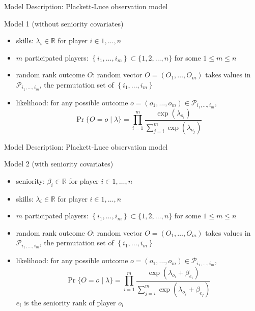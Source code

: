 \begin{frame}{Model Description: Plackett-Luce observation model}

Model 1 (without seniority covariates)
    \begin{itemize}
        \item skills: $\lambda_i\in\mathbb{R}$ for player $i\in 1, \dots, n$
        \item $m$ participated players: $\left\{i_{1}, \ldots, i_{m}\right\} \subset \{1,2, \ldots, n\}$ for some $1\le m\le n$
        \item random rank outcome $O$: random vector $O = (O_1, \dots, O_m)$ takes values in $\mathcal{P}_{i_{1}, \ldots, i_{m}}$, the permutation set of $\left\{i_{1}, \ldots, i_{m}\right\}$
        \item likelihood: for any possible outcome $o = (o_1, \dots, o_m)\in \mathcal{P}_{i_{1}, \ldots, i_{m}}$,
        \begin{equation*}
        \operatorname{Pr}\{O=o \mid \lambda\}=\prod_{i=1}^{m} \frac{\exp \left(\lambda_{o_{i}}\right)}{\sum_{j=i}^{m} \exp \left(\lambda_{o_{j}}\right)}
        \end{equation*}
    \end{itemize}
\end{frame}

\begin{frame}{Model Description: Plackett-Luce observation model}

Model 2 (with seniority covariates)
    \begin{itemize}
        \item seniority: $\beta_i \in\mathbb{R}$ for player $i\in 1, \dots, n$
        \item skills: $\lambda_i\in\mathbb{R}$ for player $i\in 1, \dots, n$
        \item $m$ participated players: $\left\{i_{1}, \ldots, i_{m}\right\} \subset \{1,2, \ldots, n\}$ for some $1\le m\le n$
        \item random rank outcome $O$: random vector $O = (O_1, \dots, O_m)$ takes values in $\mathcal{P}_{i_{1}, \ldots, i_{m}}$, the permutation set of $\left\{i_{1}, \ldots, i_{m}\right\}$
        \item likelihood: for any possible outcome $o = (o_1, \dots, o_m)\in \mathcal{P}_{i_{1}, \ldots, i_{m}}$,
        \begin{equation*}
        \operatorname{Pr}\{O=o \mid \lambda\}=\prod_{i=1}^{m} \frac{\exp \left(\lambda_{o_{i}} + \beta_{e_i}\right)}{\sum_{j=i}^{m} \exp \left(\lambda_{o_{j}} + \beta_{e_j}\right)}
        \end{equation*}
        $e_i$ is the seniority rank of player $o_i$
    \end{itemize}
\end{frame}

